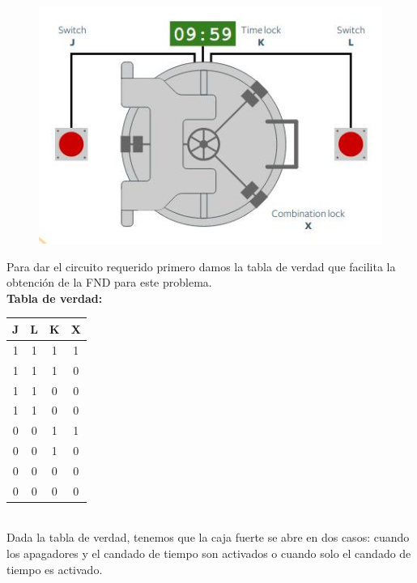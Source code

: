 \documentclass[12pt]{article} %
\begin{document}
\begin{enumerate}
            \begin{figure}[h!]
                \centering 
                \includegraphics[scale=0.7]{caja.jpg}
            \end{figure}
            \newpage
            Para dar el circuito requerido primero damos la tabla de verdad
            que facilita la obtención de la FND para este problema. 
            \\

            \textbf{Tabla de verdad:} 
            \begin{table}[h!]
                \centering
                \begin{tabular}{|c|c|c|c|}
                    \hline
                    J & L & K & X \\
                    \hline
                    1 & 1 & 1 & 1 \\
                    \hline
                    1 & 1 & 1 & 0 \\
                    \hline
                    1 & 1 & 0 & 0 \\
                    \hline
                    1 & 1 & 0 & 0 \\
                    \hline
                    0 & 0 & 1 & 1 \\
                    \hline
                    0 & 0 & 1 & 0 \\
                    \hline
                    0 & 0 & 0 & 0 \\
                    \hline
                    0 & 0 & 0 & 0 \\
                    \hline
                \end{tabular}
            \end{table}
            \\
            Dada la tabla de verdad, tenemos que la caja fuerte se abre 
            en dos casos: cuando los apagadores y el candado de tiempo
            son activados o cuando solo el candado de tiempo es activado. 
            

\end{enumerate}
\end{document}
